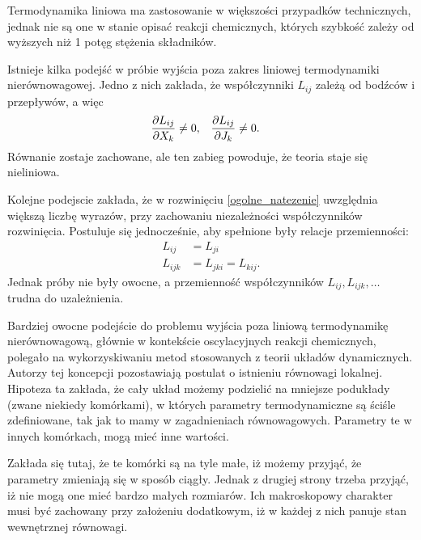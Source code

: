 \documentclass[10pt, a4paper, twoside, onecolumn]{article}
\numberwithin{equation}{section}
\begin{document}
	Termodynamika liniowa ma zastosowanie w większości przypadków technicznych, jednak nie są one w stanie opisać reakcji chemicznych, których szybkość zależy od wyższych niż 1 potęg stężenia składników. \par
	Istnieje kilka podejść w próbie wyjścia poza zakres liniowej termodynamiki nierównowagowej. Jedno z nich zakłada, że współczynniki \(L_{ij}\) zależą od bodźców i przepływów, a więc
	\begin{align}
		& \pdv{L_{ij}}{X_{k}}\neq 0, && \pdv{L_{ij}}{J_{k}}\neq 0.
	\end{align}
	Równanie 
	zostaje zachowane, ale ten zabieg powoduje, że teoria staje się nieliniowa. \par
	Kolejne podejscie zakłada, że w rozwinięciu \eqref{ogolne_natezenie} uwzględnia większą liczbę wyrazów, przy zachowaniu niezależności współczynników rozwinięcia. Postuluje się jednocześnie, aby spełnione były relacje przemienności:
	\begin{align}
		L_{ij} &= L_{ji} \\
		L_{ijk} &= L_{jki} = L_{kij}.
	\end{align}
	Jednak próby nie były owocne, a przemienność współczynników \(L_{ij}, L_{ijk}, \ldots\) trudna do uzależnienia. \par
	Bardziej owocne podejście do problemu wyjścia poza liniową termodynamikę nierównowagową, głównie w kontekście oscylacyjnych reakcji chemicznych, polegało na wykorzyskiwaniu metod stosowanych z teorii układów dynamicznych. Autorzy tej koncepcji pozostawiają postulat o istnieniu równowagi lokalnej. Hipoteza ta zakłada, że cały układ możemy podzielić na mniejsze podukłady (zwane niekiedy komórkami), w których parametry termodynamiczne są ściśle zdefiniowane, tak jak to mamy w zagadnieniach równowagowych. Parametry te w innych komórkach, mogą mieć inne wartości. \par
	Zakłada się tutaj, że te komórki są na tyle małe, iż możemy przyjąć, że parametry zmieniają się w sposób ciągły. Jednak z drugiej strony trzeba przyjąć, iż nie mogą one mieć bardzo małych rozmiarów. Ich makroskopowy charakter musi być zachowany przy założeniu dodatkowym, iż w każdej z nich panuje stan wewnętrznej równowagi. \par
	
	
	
	
	
\end{document}
